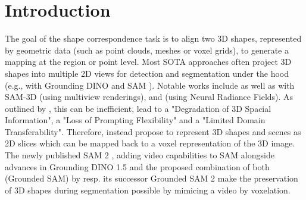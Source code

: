 \section{Introduction}
\label{sec:intro}

The goal of the shape correspondence task is to align two 3D shapes, represented by geometric data (such as point clouds, meshes or voxel grids), to generate a mapping at the region or point level. Most SOTA approaches often project 3D shapes into multiple 2D views for detection and segmentation under the hood (e.g., with Grounding DINO \cite{liu_grounding_2023} and SAM \cite{kirillov_segment_2023}).
Notable works include \citet{liu_partslip_2023} as well as \citet{abdelreheem_zero-shot_2023} with SAM-3D (using multiview renderings), and \citet{cen_segment_2023} (using Neural Radiance Fields). As outlined by \citet{guo_sam2point_2024}, this can be inefficient, lead to a "Degradation of 3D Spacial Information", a "Loss of Prompting Flexibility" and a "Limited Domain Transferability". Therefore, \citet{guo_sam2point_2024} instead propose to represent 3D shapes and scenes as 2D slices which can be mapped back to a voxel representation of the 3D image.
The newly published SAM 2 \cite{ravi_sam_2024-1}, adding video capabilities to SAM alongside advances in Grounding DINO 1.5 \cite{ren_grounding_2024} and the proposed combination of both (Grounded SAM) by \citet{ren_grounded_2024} resp. its successor Grounded SAM 2 make the preservation of 3D shapes during segmentation possible by mimicing a video by voxelation.
